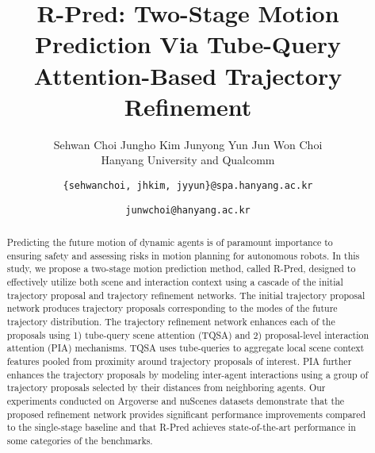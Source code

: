 \documentclass[10pt,twocolumn,letterpaper]{article}
\begin{document}
\title{R-Pred: Two-Stage Motion Prediction Via Tube-Query Attention-Based Trajectory Refinement}


\author{{Sehwan Choi
\qquad
Jungho Kim
\qquad
Junyong Yun
\qquad
Jun Won Choi}\\
Hanyang University and Qualcomm 
\and
{\tt\small \{sehwanchoi, jhkim, jyyun\}@spa.hanyang.ac.kr} \and {\tt\small junwchoi@hanyang.ac.kr}
}

\maketitle


\begin{abstract}
 Predicting the future motion of dynamic agents is of paramount importance to ensuring safety and assessing risks in motion planning for autonomous robots. In this study, we propose a two-stage motion prediction method, called R-Pred, designed to effectively utilize both scene and interaction context using a cascade  of the initial trajectory proposal and trajectory refinement networks. The  initial trajectory proposal network produces   trajectory proposals corresponding to the  modes of the future trajectory distribution. The trajectory refinement network enhances each of the  proposals  using 1) tube-query scene attention (TQSA) and 2) proposal-level interaction attention (PIA) mechanisms. TQSA uses tube-queries to aggregate local scene context features pooled from proximity around trajectory proposals of interest. PIA further enhances the trajectory proposals by modeling inter-agent interactions using a group of trajectory proposals selected by their distances from neighboring agents. Our experiments conducted on Argoverse and nuScenes datasets demonstrate that the proposed refinement network provides significant performance improvements compared to the single-stage baseline and that R-Pred achieves state-of-the-art performance in some categories of the benchmarks. 

 
\end{abstract}
\end{document}
